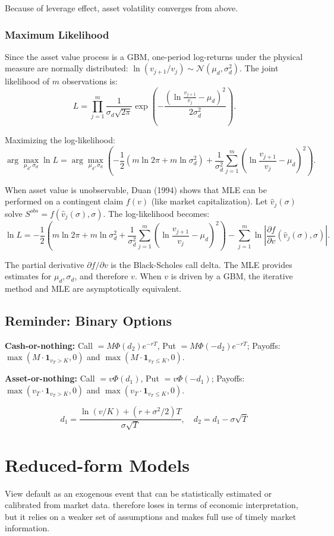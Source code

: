 \documentclass[12pt,a4paper]{article}
\begin{document}
Because of leverage effect, asset volatility converges from above.

\subsubsection{Maximum Likelihood }

Since the asset value process is a GBM, one-period log-returns under the physical measure are normally distributed: $\ln(v_{j+1}/v_j) \sim \mathcal{N}(\mu_d, \sigma_d^2)$. The joint likelihood of $m$ observations is:
$$L = \prod_{j=1}^m \frac{1}{\sigma_d\sqrt{2\pi}} \exp\left(-\frac{(\ln\frac{v_{j+1}}{v_j} - \mu_d)^2}{2\sigma_d^2}\right).$$

Maximizing the log-likelihood:
$$\arg\max_{\mu_d,\sigma_d} \ln L = \arg\max_{\mu_d,\sigma_d} \left(-\frac{1}{2}(m\ln 2\pi + m\ln\sigma_d^2) + \frac{1}{\sigma_d^2}\sum_{j=1}^m (\ln\frac{v_{j+1}}{v_j} - \mu_d)^2\right).$$

When asset value is unobservable, Duan (1994) shows that MLE can be performed on a contingent claim $f(v)$ (like market capitalization). Let $\hat{v}_j(\sigma)$ solve $S^{obs} = f(\hat{v}_j(\sigma), \sigma)$. The log-likelihood becomes:
$$\ln L = -\frac{1}{2}\left(m\ln 2\pi + m\ln\sigma_d^2 + \frac{1}{\sigma_d^2}\sum_{j=1}^m (\ln\frac{v_{j+1}}{v_j} - \mu_d)^2\right) - \sum_{j=1}^m \ln\left|\frac{\partial f}{\partial v}(\hat{v}_j(\sigma), \sigma)\right|.$$

The partial derivative $\partial f/\partial v$ is the Black-Scholes call delta. The MLE provides estimates for $\mu_d, \sigma_d$, and therefore $v$. When $v$ is driven by a GBM, the iterative method and MLE are asymptotically equivalent.

\subsection{Reminder: Binary Options}

\textbf{Cash-or-nothing:} Call $= M\Phi(d_2)e^{-rT}$, Put $= M\Phi(-d_2)e^{-rT}$; Payoffs: $\max(M \cdot \mathbf{1}_{v_T>K}, 0)$ and $\max(M \cdot \mathbf{1}_{v_T \leq K}, 0)$.

\textbf{Asset-or-nothing:} Call $= v\Phi(d_1)$, Put $= v\Phi(-d_1)$; Payoffs: $\max(v_T \cdot \mathbf{1}_{v_T>K}, 0)$ and $\max(v_T \cdot \mathbf{1}_{v_T \leq K}, 0)$.

$$d_1 = \frac{\ln(v/K) + (r + \sigma^2/2)T}{\sigma\sqrt{T}}, \quad d_2 = d_1 - \sigma\sqrt{T}$$


\section{Reduced-form Models}
View default as an exogenous event that can be statistically estimated or calibrated from market data.
therefore loses in terms of economic interpretation, but it relies on a weaker set of assumptions 
and makes full use of timely market information.
\end{document}
